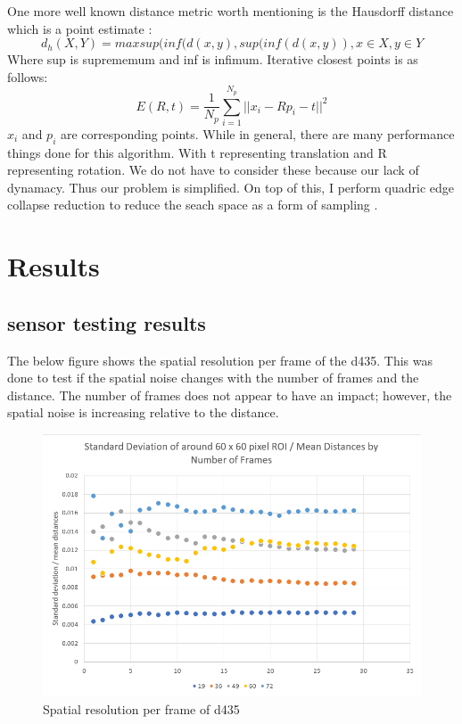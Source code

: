 One more well known distance metric worth mentioning is the Hausdorff distance which is a point estimate \cite{huttenlocher1993comparing}:
\begin{equation}
	d_h(X, Y) = max{sup(inf(d(x, y),sup(inf(d(x,y))}, x\in X, y\in Y
\end{equation}
Where sup is suprememum and inf is infimum.
Iterative closest points is as follows:
\begin{equation}
	E(R, t) = \frac{1}{N_p}\sum_{i=1}^{N_p}||x_i - Rp_i - t||^2
\end{equation}
$x_i$ and $p_i$ are corresponding points.
While in general, there are many performance things done for this algorithm. With t representing translation and R representing rotation. We do not have to consider these because our lack of dynamacy. Thus our problem is simplified. On top of this, I perform quadric edge collapse reduction to reduce the seach space as a form of sampling \cite{hussain2004efficient}.
\chapter{Results}
\section{sensor testing results}
The below figure shows the spatial resolution per frame of the d435. This was done to test if the spatial noise changes with the number of frames and the distance. The number of frames does not appear to have an impact; however, the spatial noise is increasing relative to the distance.
\begin{figure}[h]
	\caption{Spatial resolution per frame of d435}
	\centering
\includegraphics{images/d435_spatial_resolution.png}
\end{figure}

